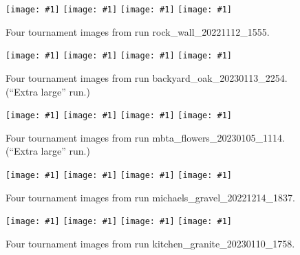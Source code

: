 \documentclass[acmtog,
    anonymous,
    review
    ]{acmart}
\newcommand{\runID}{\footnotesize}
\newcommand{\igfour}[1]{\texttt{[image: \#1]}}
\begin{document}


\begin{figure}
    \igfour{20221112_1555_step_6495.png}
    \hfill
    \igfour{20221112_1555_step_5510.png}
    \hfill
    \igfour{20221112_1555_step_5681.png}
    \hfill
    \igfour{20221112_1555_step_6370.png}
    \caption{Four tournament images from run {\runID rock\_wall\_20221112\_1555}.}
    \label{fig:rock_wall_4x}
\end{figure}

\begin{figure}
    \igfour{20230115_step_6902.png}
    \hfill
    \igfour{20230115_step_7682.png}
    \hfill
    \igfour{20230115_step_7942.png}
    \hfill
    \igfour{20230115_step_12413.png}
    \caption{Four tournament images from run {\runID backyard\_oak\_20230113\_2254}. (“Extra large” run.)}
    \label{fig:backyard_oak_4x}
\end{figure}

\begin{figure}
    \igfour{20230106_step_11019.png}
    \hfill
    \igfour{20230106_step_11204.png}
    \hfill
    \igfour{20230106_step_11689.png}
    \hfill
    \igfour{20230106_step_11995.png}
    \caption{Four tournament images from run {\runID mbta\_flowers\_20230105\_1114}. (“Extra large” run.)}
    \label{fig:mbta_flowers_4x}
\end{figure}

\begin{figure}
    \igfour{20221215_step_5867.png}
    \hfill
    \igfour{20221215_step_5892.png}
    \hfill
    \igfour{20221215_step_6830.png}
    \hfill
    \igfour{20221215_step_6916.png}
    \caption{Four tournament images from run {\runID michaels\_gravel\_20221214\_1837}.}
    \label{fig:michaels_gravel_4x}
\end{figure}

\begin{figure}
    \igfour{20230111_step_5576.png}
    \hfill
    \igfour{20230111_step_6159.png}
    \hfill
    \igfour{20230111_step_6303.png}
    \hfill
    \igfour{20230111_step_6726.png}
    \caption{Four tournament images from run {\runID kitchen\_granite\_20230110\_1758}.}
    \label{fig:kitchen_granite_4x}
\end{figure}
\end{document}
